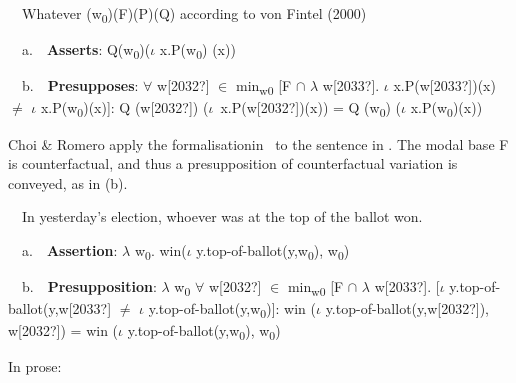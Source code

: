 \begin{styleStandard}
\label{bkm:Ref533762404}\ \ Whatever (w\textsubscript{0})(F)(P)(Q) according to von Fintel (2000)
\end{styleStandard}

\begin{styleStandard}
\ \ a.\ \ \textbf{Asserts}: Q(w\textsubscript{0})($\iota $ x.P(w\textsubscript{0}) (x))
\end{styleStandard}

\begin{styleStandard}
\ \ b.\ \ \textbf{Presupposes}: ${\forall}$ w[2032?] ${\in}$ min\textsubscript{w0} [F ${\cap}$ $\lambda $ w[2033?]. $\iota $ x.P(w[2033?])(x) ${\neq}$ $\iota $ x.P(w\textsubscript{0})(x)]: Q (w[2032?]) ($\iota $~x.P(w[2032?])(x)) = Q (w\textsubscript{0}) ($\iota $ x.P(w\textsubscript{0})(x))
\end{styleStandard}

\begin{styleStandard}
Choi \& Romero apply the formalisation\textstyleannotationreference{ }in \ to the sentence in . The modal base F is counterfactual, and thus a presupposition of counterfactual variation is conveyed, as in (b).
\end{styleStandard}

\begin{styleStandard}
\label{bkm:Ref150779072}\ \ In yesterday’s election, whoever was at the top of the ballot won.
\end{styleStandard}

\begin{styleStandard}
\ \ a.\ \ \textbf{Assertion}: $\lambda $ w\textsubscript{0}. win($\iota $ y.top-of-ballot(y,w\textsubscript{0}), w\textsubscript{0})
\end{styleStandard}

\begin{styleStandard}
\ \ b.\ \ \textbf{Presupposition}: $\lambda $ w\textsubscript{0 }${\forall}$ w[2032?] ${\in}$ min\textsubscript{w0} [F ${\cap}$ $\lambda $ w[2033?]. [$\iota $ y.top-of-ballot(y,w[2033?] ${\neq}$ $\iota $ y.top-of-ballot(y,w\textsubscript{0})]: win ($\iota $ y.top-of-ballot(y,w[2032?]), w[2032?]) = win ($\iota $ y.top-of-ballot(y,w\textsubscript{0}), w\textsubscript{0})
\end{styleStandard}

\begin{styleStandard}
In prose:
\end{styleStandard}

